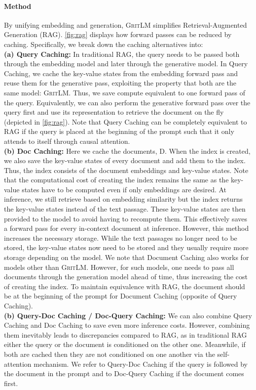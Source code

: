 \documentclass{article}
\newcommand{\model}{\textsc{GritLM}}
\begin{document}
\paragraph{Method} By unifying embedding and generation, \model{} simplifies Retrieval-Augmented Generation (RAG). \autoref{fig:rag} displays how forward passes can be reduced by caching. Specifically, we break down the caching alternatives into:\\
\textbf{(a) Query Caching:} In traditional RAG, the query needs to be passed both through the embedding model and later through the generative model. In Query Caching, we cache the key-value states from the embedding forward pass and reuse them for the generative pass, exploiting the property that both are the same model: \model{}. Thus, we save compute equivalent to one forward pass of the query. Equivalently, we can also perform the generative forward pass over the query first and use its representation to retrieve the document on the fly (depicted in \autoref{fig:rag}). Note that Query Caching can be completely equivalent to RAG if the query is placed at the beginning of the prompt such that it only attends to itself through causal attention.\\
\textbf{(b) Doc Caching:} Here we cache the documents, D. When the index is created, we also save the key-value states of every document and add them to the index. Thus, the index consists of the document embeddings and key-value states. Note that the computational cost of creating the index remains the same as the key-value states have to be computed even if only embeddings are desired. At inference, we still retrieve based on embedding similarity but the index returns the key-value states instead of the text passage. These key-value states are then provided to the model to avoid having to recompute them. This effectively saves a forward pass for every in-context document at inference. However, this method increases the necessary storage. While the text passages no longer need to be stored, the key-value states now need to be stored and they usually require more storage depending on the model. We note that Document Caching also works for models other than \model{}. However, for such models, one needs to pass all documents through the generation model ahead of time, thus increasing the cost of creating the index. To maintain equivalence with RAG, the document should be at the beginning of the prompt for Document Caching (opposite of Query Caching).\\
\textbf{(b) Query-Doc Caching / Doc-Query Caching:} We can also combine Query Caching and Doc Caching to save even more inference costs. However, combining them inevitably leads to discrepancies compared to RAG, as in traditional RAG either the query or the document is conditioned on the other one. Meanwhile, if both are cached then they are not conditioned on one another via the self-attention mechanism. We refer to Query-Doc Caching if the query is followed by the document in the prompt and to Doc-Query Caching if the document comes first.
\end{document}
